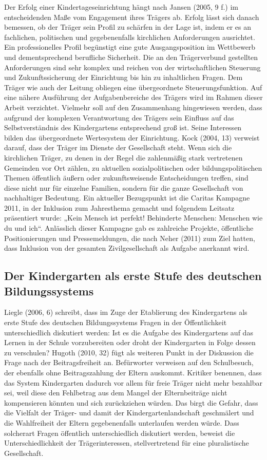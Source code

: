 Der Erfolg einer Kindertageseinrichtung hängt nach Jansen (2005, 9 f.) im entscheidenden Maße vom Engagement ihres Trägers ab. Erfolg lässt sich danach bemessen, ob der Träger sein Profil zu schärfen in der Lage ist, indem er es an fachlichen, politischen und gegebenenfalls kirchlichen Anforderungen ausrichtet. Ein professionelles Profil begünstigt eine gute Ausgangsposition im Wettbewerb und dementsprechend berufliche Sicherheit. Die an den Trägerverbund gestellten Anforderungen sind sehr komplex und reichen von der wirtschaftlichen Steuerung und Zukunftssicherung der Einrichtung bis hin zu inhaltlichen Fragen. Dem Träger wie auch der Leitung obliegen eine übergeordnete Steuerungsfunktion. Auf eine nähere Ausführung der Aufgabenbereiche des Trägers wird im Rahmen dieser Arbeit verzichtet. Vielmehr soll auf den Zusammenhang hingewiesen werden, dass aufgrund der komplexen Verantwortung des Trägers sein Einfluss auf das Selbstverständnis des Kindergartens entsprechend groß ist. Seine Interessen bilden das übergeordnete Wertesystem der Einrichtung. Kock (2004, 13) verweist darauf, dass der Träger im Dienste der Gesellschaft steht. Wenn sich die kirchlichen Träger, zu denen in der Regel die zahlenmäßig stark vertretenen Gemeinden vor Ort zählen, zu aktuellen sozialpolitischen oder bildungspolitischen Themen öffentlich äußern oder zukunftsweisende Entscheidungen treffen, sind diese nicht nur für einzelne Familien, sondern für die ganze Gesellschaft von nachhaltiger Bedeutung. Ein aktueller Bezugspunkt ist die Caritas Kampagne 2011, in der Inklusion zum Jahresthema gemacht und folgendem Leitsatz präsentiert wurde: „Kein Mensch ist perfekt! Behinderte Menschen: Menschen wie du und ich“. Anlässlich dieser Kampagne gab es zahlreiche Projekte, öffentliche Positionierungen und Pressemeldungen, die nach Neher (2011) zum Ziel hatten, dass Inklusion von der gesamten Zivilgesellschaft als Aufgabe anerkannt wird.
   
\subsection{Der Kindergarten als erste Stufe des deutschen Bildungssystems}
Liegle (2006, 6) schreibt, dass im Zuge der Etablierung des Kindergartens als erste Stufe des deutschen Bildungssystems Fragen in der Öffentlichkeit unterschiedlich diskutiert werden: Ist es die Aufgabe des Kindergartens auf das Lernen in der Schule vorzubereiten oder droht der Kindergarten in Folge dessen zu verschulen? Hugoth (2010, 32) fügt als weiteren Punkt in der Diskussion die Frage nach der Beitragsfreiheit an. Befürworter verweisen auf den Schulbesuch, der ebenfalls ohne Beitragszahlung der Eltern auskommt. Kritiker benennen, dass das System Kindergarten dadurch vor allem für freie Träger nicht mehr bezahlbar sei, weil diese den Fehlbetrag aus dem Mangel der Elternbeiträge nicht kompensieren könnten und sich zurückziehen würden. Das birgt die Gefahr, dass die Vielfalt der Träger- und damit der Kindergartenlandschaft geschmälert und die Wahlfreiheit der Eltern gegebenenfalls unterlaufen werden würde. Dass solcherart Fragen öffentlich unterschiedlich diskutiert werden, beweist die Unterschiedlichkeit der Trägerinteressen, stellvertretend für eine pluralistische Gesellschaft. 

